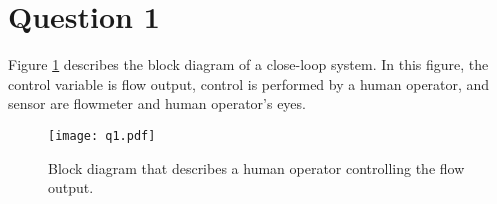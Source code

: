 \graphicspath{{images/}}
\section{Question 1}
Figure \ref{fig:q1} describes the block diagram of a close-loop system. In this figure, the control variable is flow output, control is performed by a human operator, and sensor are flowmeter and human operator's eyes. 

\begin{figure}[h!]
	\centering
	\texttt{[image: q1.pdf]}
	\caption{Block diagram that describes a human operator controlling the flow output.}
	\label{fig:q1}
\end{figure}